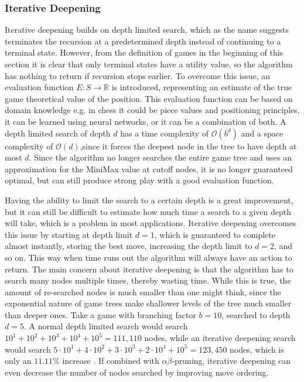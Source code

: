 \subsubsection{Iterative Deepening}
Iterative deepening builds on depth limited search, which as the name suggests terminates the recursion at a predetermined depth instead of continuing to a terminal state. However, from the definition of games in the beginning of this section it is clear that only terminal states have a utility value, so the algorithm has nothing to return if recursion stops earlier. To overcome this issue, an evaluation function $E: S \rightarrow \mathbb{R}$ is introduced, representing an estimate of the true game theoretical value of the position. This evaluation function can be based on domain knowledge e.g. in chess it could be piece values and positioning principles, it can be learned using neural networks, or it can be a combination of both. A depth limited search of depth $d$ has a time complexity of $\mathcal{O}(b^d)$ and a space complexity of $\mathcal{O}(d)$,since it forces the deepest node in the tree to have depth at most $d$. Since the algorithm no longer searches the entire game tree and uses an approximation for the MiniMax value at cutoff nodes, it is no longer guaranteed optimal, but can still produce strong play with a good evaluation function.

Having the ability to limit the search to a certain depth is a great improvement, but it can still be difficult to estimate how much time a search to a given depth will take, which is a problem in most applications. Iterative deepening overcomes this issue by starting at depth limit $d=1$, which is guaranteed to complete almost instantly, storing the best move, increasing the depth limit to  $d=2$, and so on. This way when time runs out the algorithm will always have an action to return. The main concern about iterative deepening is that the algorithm has to search many nodes multiple times, thereby wasting time. While this is true, the amount of re-searched nodes is much smaller than one might think, since the exponential nature of game trees make shallower levels of the tree much smaller than deeper ones. Take a game with branching factor $b=10$, searched to depth $d=5$. A normal depth limited search would search $10^1+10^2+10^3+10^4+10^5=111,110$ nodes, while an iterative deepening search would search $5 \cdot 10^1+4 \cdot 10^2+3 \cdot 10^3+2 \cdot 10^4+10^5=123,450$ nodes, which is only an $11.11\%$ increase \cite[p. 99]{russellnorvig}. If combined with $\alpha\beta$-pruning, iterative deepening can even decrease the number of nodes searched by improving move ordering.

